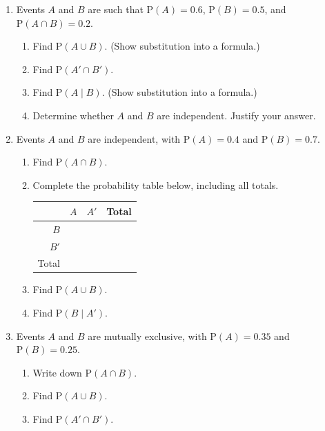 \documentclass[12pt, twoside]{article}
\begin{document}
\begin{enumerate}[itemsep=0.1cm]
\newpage
\item Events $A$ and $B$ are such that $\mathrm{P}(A) = 0.6$, $\mathrm{P}(B) = 0.5$, and
$\mathrm{P}(A \cap B) = 0.2$.
\begin{enumerate}[itemsep=3cm]
    \item Find $\mathrm{P}(A \cup B)$. (Show substitution into a formula.)
    \item Find $\mathrm{P}(A' \cap B')$.
    \item Find $\mathrm{P}(A \mid B)$. (Show substitution into a formula.)
    \item Determine whether $A$ and $B$ are independent. Justify your answer.
\end{enumerate}

\newpage

\item Events $A$ and $B$ are independent, with $\mathrm{P}(A) = 0.4$ and $\mathrm{P}(B) = 0.7$.
\begin{enumerate}[itemsep=1.2cm]
    \item Find $\mathrm{P}(A \cap B)$.
    \item Complete the probability table below, including all totals.
    \renewcommand{\arraystretch}{2}
    \begin{center}
    \begin{tabular}{r|p{1.5cm}|p{1.5cm}|p{1.5cm}}
        & $A$ & $A'$ & Total \\
        \hline
        $B$      & & & \\
        \hline
        $B'$     & & & \\
        \hline
        Total    & & & \\
    \end{tabular}
    \end{center}
    \item Find $\mathrm{P}(A \cup B)$.
    \item Find $\mathrm{P}(B \mid A')$.
\end{enumerate} \vspace{1.5cm}

\item Events $A$ and $B$ are mutually exclusive, with $\mathrm{P}(A) = 0.35$ and $\mathrm{P}(B) = 0.25$.
\begin{enumerate}[itemsep=1.5cm]
    \item Write down $\mathrm{P}(A \cap B)$.
    \item Find $\mathrm{P}(A \cup B)$.
    \item Find $\mathrm{P}(A' \cap B')$.
\end{enumerate} \vspace{0.5cm}


\end{enumerate}
\end{document}
